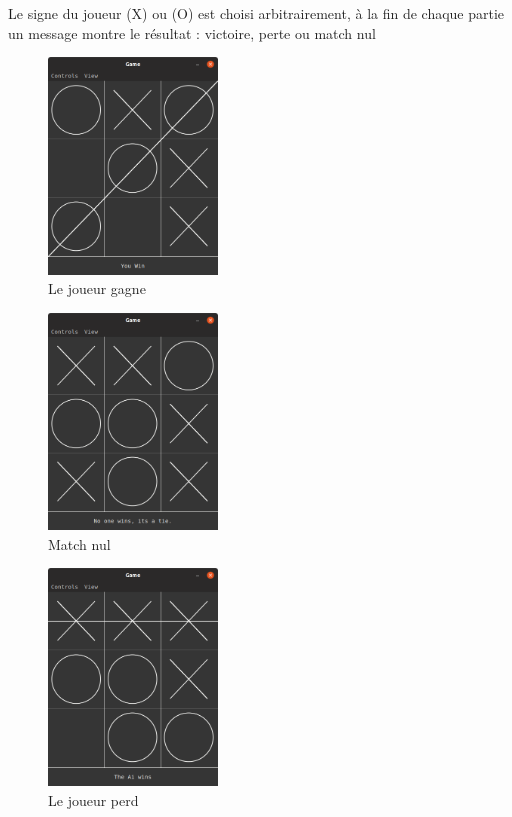 Le signe du joueur (X) ou (O) est choisi arbitrairement,  à la fin de chaque partie un message montre le résultat : victoire, perte ou match nul 
\begin{figure}[H]
	\centering
	\includegraphics[width=0.4\textwidth]{win.PNG}
	  \caption{Le joueur gagne}
	\label{fig:Le joueur gagne}
\end{figure}
\begin{figure}[H]
	\centering
	\includegraphics[width=0.4\textwidth]{tie .PNG}
	  \caption{Match nul}
	\label{fig:match nul}
\end{figure}
\begin{figure}[H]
	\centering
	\includegraphics[width=0.4\textwidth]{loss against ai .PNG}
	  \caption{Le joueur perd}
	\label{fig:Le joueur perd}
\end{figure}
\clearpage
